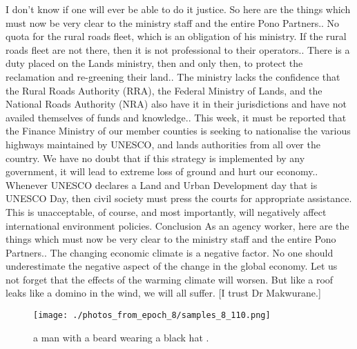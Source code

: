 \documentclass{article}%
\begin{document}
I don’t know if one will ever be able to do it justice.\newline%
So here are the things which must now be very clear to the ministry staff and the entire Pono Partners.. No quota for the rural roads fleet, which is an obligation of his ministry. If the rural roads fleet are not there, then it is not professional to their operators.. There is a duty placed on the Lands ministry, then and only then, to protect the reclamation and re{-}greening their land.. The ministry lacks the confidence that the Rural Roads Authority (RRA), the Federal Ministry of Lands, and the National Roads Authority (NRA) also have it in their jurisdictions and have not availed themselves of funds and knowledge.. This week, it must be reported that the Finance Ministry of our member counties is seeking to nationalise the various highways maintained by UNESCO, and lands authorities from all over the country. We have no doubt that if this strategy is implemented by any government, it will lead to extreme loss of ground and hurt our economy.. Whenever UNESCO declares a Land and Urban Development day that is UNESCO Day, then civil society must press the courts for appropriate assistance. This is unacceptable, of course, and most importantly, will negatively affect international environment policies.\newline%
Conclusion\newline%
As an agency worker, here are the things which must now be very clear to the ministry staff and the entire Pono Partners.. The changing economic climate is a negative factor. No one should underestimate the negative aspect of the change in the global economy. Let us not forget that the effects of the warming climate will worsen. But like a roof leaks like a domino in the wind, we will all suffer.\newline%
{[}I trust Dr Makwurane.{]}\newline%

%


\begin{figure}[h!]%
\centering%
\texttt{[image: ./photos\_from\_epoch\_8/samples\_8\_110.png]}%
\caption{a man with a beard wearing a black hat .}%
\end{figure}

%
\end{document}
